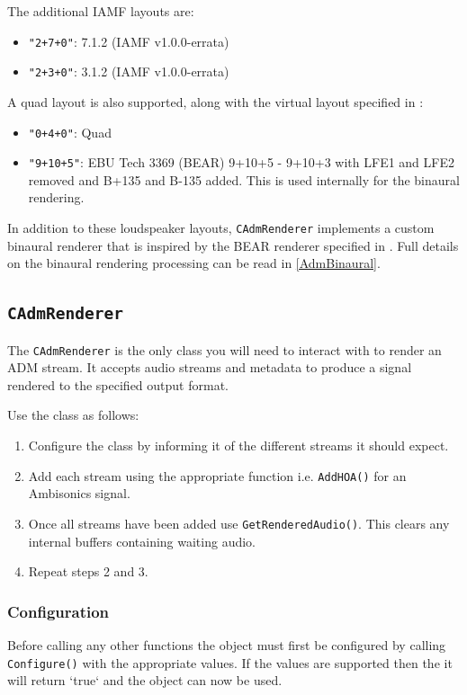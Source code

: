 \documentclass[12pt]{report}
\newcommand{\code}[1]{\texttt{#1}}
\begin{document}
The additional IAMF layouts are: 
\begin{itemize}
    \item \code{"2+7+0"}: 7.1.2 (IAMF v1.0.0-errata)
    \item \code{"2+3+0"}: 3.1.2 (IAMF v1.0.0-errata)
\end{itemize}

A quad layout is also supported, along with the virtual layout specified in \cite{EBU3369}:
\begin{itemize}
    \item \code{"0+4+0"}: Quad
    \item \code{"9+10+5"}: EBU Tech 3369 (BEAR) 9+10+5 - 9+10+3 with LFE1 and LFE2 removed and B+135 and B-135 added. This is used internally for the binaural rendering.
\end{itemize}

In addition to these loudspeaker layouts, \code{CAdmRenderer} implements a custom binaural renderer that is inspired by the BEAR renderer specified in \cite{EBU3369}. Full details on the binaural rendering processing can be read in \cref{AdmBinaural}.

\subsection{\code{CAdmRenderer}}

The \code{CAdmRenderer} is the only class you will need to interact with to render an ADM stream. It accepts audio streams and metadata to produce a signal rendered to the specified output format.

Use the class as follows:
\begin{enumerate}
    \item Configure the class by informing it of the different streams it should expect.
    \item Add each stream using the appropriate function i.e. \code{AddHOA()} for an Ambisonics signal.
    \item Once all streams have been added use \code{GetRenderedAudio()}. This clears any internal buffers containing waiting audio.
    \item Repeat steps 2 and 3.
\end{enumerate}

\subsubsection{Configuration}

Before calling any other functions the object must first be configured by calling \code{Configure()} with the appropriate values. If the values are supported then the it will return `true` and the object can now be used.
\end{document}
